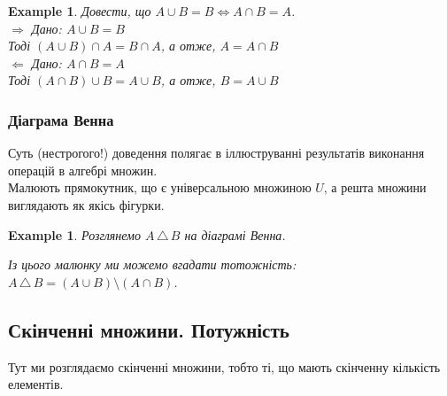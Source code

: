\documentclass[a4paper, 14pt]{extarticle}
\def\rightproof{$\boxed{\Rightarrow}$ }
\def\leftproof{$\boxed{\Leftarrow}$ }
\theoremstyle{theoremdd}
\theoremstyle{theoremdd}
\theoremstyle{theoremdd}
\theoremstyle{theoremdd}
\theoremstyle{theoremdd}
\newtheorem{example}[theorem]{Example}
\theoremstyle{theoremdd}
\theoremstyle{theoremdd}
\theoremstyle{theoremdd}
\theoremstyle{theoremdd}
\theoremstyle{theoremdd}
\theoremstyle{theoremdd}
\theoremstyle{theoremdd}
\theoremstyle{theoremdd}
\theoremstyle{theoremdd}
\theoremstyle{theoremdd}
\newcommand{\symdif}{\,\triangle\,} %
\begin{document}
\begin{example}
Довести, що $A \cup B = B \iff A \cap B = A$.\\
\rightproof Дано: $A \cup B = B$\\
Тоді $(A \cup B) \cap A = B \cap A$, а отже, $A = A \cap B$
\bigskip \\
\leftproof Дано: $A \cap B = A$\\
Тоді $(A \cap B) \cup B = A \cup B$, а отже, $B = A \cup B$
\end{example}

\subsubsection{Діаграма Венна}
Суть (нестрогого!) доведення полягає в іллюструванні результатів виконання операцій в алгебрі множин.\\
Малюють прямокутник, що є універсальною множиною $U$, а решта множини виглядають як якісь фігурки.
\begin{example}
Розглянемо $A \symdif B$ на діаграмі Венна.

\begin{figure}[H]
\centering
{}
\qquad
{}
\end{figure}
Із цього малюнку ми можемо вгадати тотожність: \\ $A \symdif B = (A \cup B) \setminus (A \cap B)$.
\end{example}

\subsection{Скінченні множини. Потужність}
Тут ми розглядаємо скінченні множини, тобто ті, що мають скінченну кількість елементів.
\end{document}
